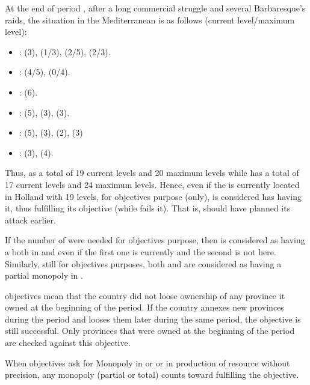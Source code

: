 \begin{exemple}
  At the end of period , after a long commercial struggle
  and several Barbaresque's raids, the situation in the Mediterranean is
  as follows (current level/maximum level):
  \begin{itemize}
  \item {}: \HOL (3), \HIS (1/3), \VEN (2/5), \FRA (2/3).
  \item {}: \HOL(4/5), \VEN (0/4).
  \item {}: \VEN (6).
  \item {}: \TUR (5), \VEN (3), \HOL (3).
  \item {}: \HOL (5), \VEN (3), \TUR (2), \FRA (3)
  \item {}: \VEN (3), \HOL (4).
  \end{itemize}
  Thus, \HOL as a total of 19 current levels and 20 maximum levels while
  \VEN has a total of 17 current levels and 24 maximum levels. Hence,
  even if the  is currently located in Holland with 19
  levels, for objectives purpose (only), \VEN is considered has having
  it, thus fulfilling its objective (while \HOL fails it). That is, \HOL
  should have planned its attack earlier.

  If the number of \TradeFLEET were needed for objectives purpose, then
  \VEN is considered as having a \TradeFLEET\faceplus both in 
  and  even if the first one is currently \Facemoins and
  the second is not here. Similarly, still for objectives purposes, both
  \HOL and \VEN are considered as having a partial monopoly in
  .
\end{exemple}

 objectives mean that the country did not loose
ownership of any province it owned at the beginning of the period.
\bparag If the country annexes new provinces during the period and
looses them later during the same period, the objective is still
successful. Only provinces that were owned at the beginning of the
period are checked against this objective.

 When objectives ask for Monopoly in \STZ
or \CTZ or in production of resource without precision, any monopoly
(partial or total) counts toward fulfilling the objective.

